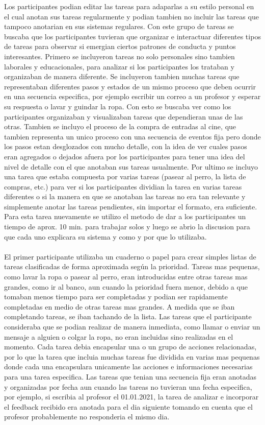 Los participantes podian editar las tareas para adaparlas a su estilo personal en el cual anotan sus tareas regularmente y podian tambien no incluir las tareas que tampoco anotarian en sus sistemas regulares. Con este grupo de tareas se buscaba que los participantes tuvieran que organizar e interactuar diferentes tipos de tareas para observar si emergian ciertos patrones de conducta y puntos interesantes. Primero se incluyeron tareas no solo personales sino tambien laborales y educacionales, para analizar si los participantes los trataban y organizaban de manera diferente. Se incluyeron tambien muchas tareas que representaban diferentes pasos y estados de un mismo proceso que deben ocurrir en una secuencia especifica, por ejemplo escribir un correo a un profesor y esperar su respuesta o lavar y guindar la ropa. Con esto se buscaba ver como los participantes organizaban y visualizaban tareas que dependieran unas de las otras. Tambien se incluyo el proceso de la compra de entradas al cine, que tambien representa un unico proceso con una secuencia de eventos fija pero donde los pasos estan desglozados con mucho detalle, con la idea de ver cuales pasos eran agregados o dejados afuera por los participantes para tener una idea del nivel de detalle con el que anotaban sus tareas usualmente. Por ultimo se incluyo una tarea que estaba compuesta por varias tareas (pasear al perro, la lista de compras, etc.) para ver si los participantes dividian la tarea en varias tareas diferentes o si la manera en que se anotaban las tareas no era tan relevante y simplemente anotar las tareas pendientes, sin importar el formato, era suficiente. 
\\
Para esta tarea nuevamente se utilizo el metodo de dar a los participantes un tiempo de aprox. 10 min. para trabajar solos y luego se abrio la discusion para que cada uno explicara su sistema y como y por que lo utilizaba.\\
\\
El primer participante utilizaba un cuaderno o papel para crear simples listas de tareas clasificadas de forma aproximada según la prioridad. Tareas mas pequenas, como lavar la ropa o pasear al perro, eran introducidas entre otras tareas mas grandes, como ir al banco, aun cuando la prioridad fuera menor, debido a que tomaban menos tiempo para ser completadas y podian ser rapidamente completadas en medio de otras tareas mas grandes. A medida que se iban completando tareas, se iban tachando de la lista. Las tareas que el participante consideraba que se podian realizar de manera inmediata, como llamar o enviar un mensaje a alguien o colgar la ropa, no eran incluidas sino realizadas en el momento. Cada tarea debia encapsular una o un grupo de acciones relacionadas, por lo que la tarea que incluia muchas tareas fue dividida en varias mas pequenas donde cada una encapsulara unicamente las acciones e informaciones necesarias para una tarea especifica. Las tareas que tenian una secuencia fija eran anotadas y organizadas por fecha aun cuando las tareas no tuvieran una fecha especifica, por ejemplo, si escribia al profesor el 01.01.2021, la tarea de analizar e incorporar el feedback recibido era anotada para el dia siguiente tomando en cuenta que el profesor probablemente no responderia el mismo dia. 
